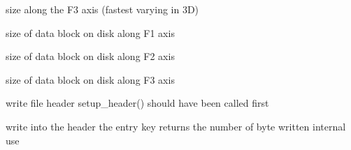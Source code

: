 \documentclass[letterpaper,10pt,openany,oneside]{sphinxmanual}
\begin{document}
\begin{fulllineitems}
\begin{fulllineitems}
\end{fulllineitems}


\begin{fulllineitems}
\label{rst/code:File.GifaFile.GifaFile.size3}
size along the F3 axis (fastest varying in 3D)

\end{fulllineitems}


\begin{fulllineitems}
\label{rst/code:File.GifaFile.GifaFile.szblock1}
size of data block on disk along F1 axis

\end{fulllineitems}


\begin{fulllineitems}
\label{rst/code:File.GifaFile.GifaFile.szblock2}
size of data block on disk along F2 axis

\end{fulllineitems}


\begin{fulllineitems}
\label{rst/code:File.GifaFile.GifaFile.szblock3}
size of data block on disk along F3 axis

\end{fulllineitems}


\begin{fulllineitems}
\label{rst/code:File.GifaFile.GifaFile.write_header}
write file header
setup\_header() should have been called first

\end{fulllineitems}


\begin{fulllineitems}
\label{rst/code:File.GifaFile.GifaFile.write_header_line}
write into the header the entry key
returns the number of byte written
internal use


\end{fulllineitems}
\end{fulllineitems}
\end{document}
